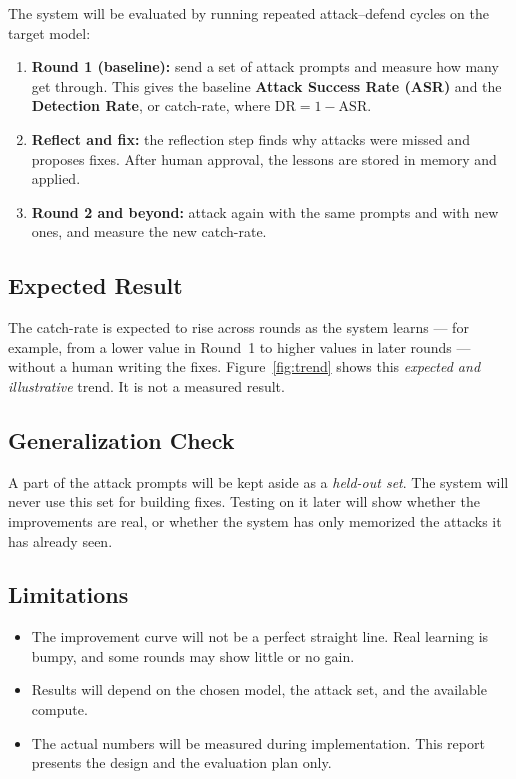 \medskip
The system will be evaluated by running repeated attack--defend cycles on the
target model:

\begin{enumerate}
  \item \textbf{Round 1 (baseline):} send a set of attack prompts and measure how
  many get through. This gives the baseline \textbf{Attack Success Rate (ASR)}
  and the \textbf{Detection Rate}, or catch-rate, where
  $\mathrm{DR} = 1 - \mathrm{ASR}$.
  \item \textbf{Reflect and fix:} the reflection step finds why attacks were
  missed and proposes fixes. After human approval, the lessons are stored in
  memory and applied.
  \item \textbf{Round 2 and beyond:} attack again with the same prompts and with
  new ones, and measure the new catch-rate.
\end{enumerate}

\subsection{Expected Result}

The catch-rate is expected to rise across rounds as the system learns --- for
example, from a lower value in Round~1 to higher values in later rounds ---
without a human writing the fixes. Figure~\ref{fig:trend} shows this
\emph{expected and illustrative} trend. It is not a measured result.


\subsection{Generalization Check}

A part of the attack prompts will be kept aside as a \emph{held-out set}. The
system will never use this set for building fixes. Testing on it later will show
whether the improvements are real, or whether the system has only memorized the
attacks it has already seen.

\subsection{Limitations}

\begin{itemize}
  \item The improvement curve will not be a perfect straight line. Real learning
  is bumpy, and some rounds may show little or no gain.
  \item Results will depend on the chosen model, the attack set, and the
  available compute.
  \item The actual numbers will be measured during implementation. This report
  presents the design and the evaluation plan only.
\end{itemize}
